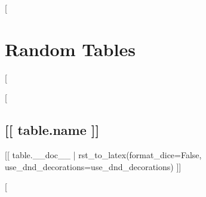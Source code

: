 [%
\section*{Random Tables}
[%

[%
\subsection*{[[ table.name ]]}

[[ table.__doc__ | rst_to_latex(format_dice=False, use_dnd_decorations=use_dnd_decorations) ]]

[%
